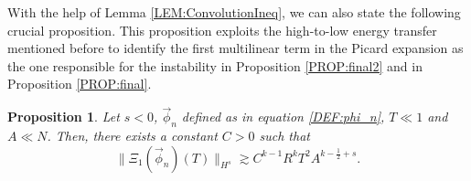 \documentclass[letterpaper, 11pt,  reqno]{amsart}
\newtheorem{proposition}[theorem]{Proposition}
\newcommand{\1}{\hspace{0.5mm}\text{I}\hspace{0.5mm}}
\newcommand{\ges}{\gtrsim}
\numberwithin{equation}{section}
\numberwithin{theorem}{section}
\begin{document}
With the help of Lemma \ref{LEM:ConvolutionIneq}, we can also state the following crucial proposition. This proposition exploits the high-to-low energy transfer mentioned before to identify the first multilinear term in the Picard expansion as the one responsible for the instability in Proposition \ref{PROP:final2} and in Proposition \ref{PROP:final}.

\begin{proposition}
\label{PROP:EstSecondPicard}
Let $s < 0$, $\vec{\phi}_n$ defined as in equation \eqref{DEF:phi_n}, $T \ll 1$ and $A \ll N $. Then, there exists a constant $C > 0$ such that
\begin{equation}
\label{EQ:EstSecondPicard}
\| \Xi_1 (\vec{\phi}_n) (T) \|_{ H^s} \ges C^{k-1} R^k T^2 A^{k - \frac 12 + s}.
\end{equation}

\end{proposition}
\end{document}
